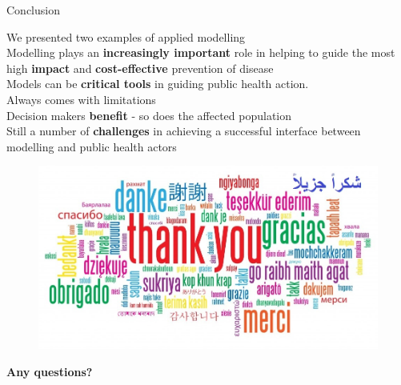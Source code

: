 \documentclass[table]{beamer}\usepackage[]{graphicx}\usepackage[]{color}
\newcommand\unnumbered{\setbeamertemplate{footline}{}}
\begin{document}
\begin{frame}[fragile]{Conclusion}

We presented two examples of applied modelling \\
\vspace{0.3cm}
Modelling plays an \textbf{increasingly important} role in helping to guide the most high \textbf{impact} and \textbf{cost-effective} prevention of disease \\
\vspace{0.3cm}
Models can be \textbf{critical tools} in guiding public health action. \\
\vspace{0.3cm}
Always comes with limitations \\ %
\vspace{0.3cm}
Decision makers \textbf{benefit} - so does the affected population \\
\vspace{0.3cm}
Still a number of \textbf{challenges} in achieving a successful interface between modelling and public health actors

\end{frame}

{\unnumbered
\begin{frame}[noframenumbering]{}
\begin{center}
\begin{figure}
  \centering
  \includegraphics[width=\textwidth,height=0.5\textheight,keepaspectratio]{Thank-you-word-cloud.jpg}
\end{figure}

\pause \Huge{\textbf{Any questions?}}

\end{center}
\end{frame}}
\end{document}
